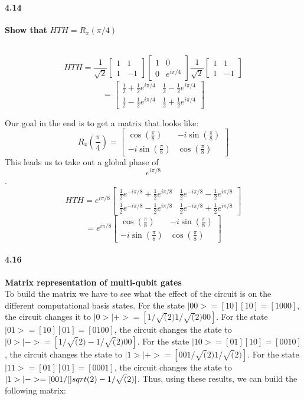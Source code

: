\paragraph{4.14} \textbf{Show that} $HTH = R_x(\pi/4)$

\\

$$HTH = \frac{1}{\sqrt{2}}\begin{bmatrix}1 & 1\\1 & -1\end{bmatrix}\begin{bmatrix}1 & 0\\0 & e^{i\pi /4}\end{bmatrix}\frac{1}{\sqrt{2}}\begin{bmatrix}1 & 1\\1 & -1\end{bmatrix}$$
$$= \begin{bmatrix}\frac{1}{2} + \frac{1}{2}e^{i \pi /4} & \frac{1}{2} - \frac{1}{2}e^{i \pi /4}\\\frac{1}{2} - \frac{1}{2}e^{i \pi /4} & \frac{1}{2} + \frac{1}{2}e^{i \pi /4}\end{bmatrix}$$


Our goal in the end is to get a matrix that looks like:
$$R_x(\frac{\pi}{4}) = \begin{bmatrix}\cos(\frac{\pi}{8}) & -i\sin(\frac{\pi}{8})\\-i\sin(\frac{\pi}{8}) & \cos(\frac{\pi}{8})\end{bmatrix}$$
This leads us to take out a global phase of $$e^{i\pi /8}$$.
$$HTH = e^{i\pi /8}\begin{bmatrix}\frac{1}{2}e^{-i\pi /8} + \frac{1}{2}e^{i\pi /8} & \frac{1}{2}e^{-i\pi /8} - \frac{1}{2}e^{i\pi /8}\\\frac{1}{2}e^{-i\pi /8} - \frac{1}{2}e^{i\pi /8} & \frac{1}{2}e^{-i\pi /8} + \frac{1}{2}e^{i\pi /8}\end{bmatrix}$$
$$= e^{i\pi /8} \begin{bmatrix}\cos(\frac{\pi}{8}) & -i\sin(\frac{\pi}{8})\\-i\sin(\frac{\pi}{8}) & \cos(\frac{\pi}{8})\end{bmatrix}$$


\paragraph{4.16} \textbf{Matrix representation of multi-qubit gates}
\\

To build the matrix we have to see what the effect of the circuit is on the different computational basis states. For the state $|00> = [1 0][1 0] = [1 0 0 0]$, the circuit changes it to $|0>|+> = [1/\sqrt(2) 1/\sqrt(2) 0 0]$. For the state $|01> = [1 0][0 1] = [0 1 0 0]$, the circuit changes the state to $|0>|-> = [1/\sqrt(2) -1/\sqrt(2) 0 0]$. For the state $|10> = [0 1][1 0] = [0 0 1 0]$, the circuit changes the state to $|1>|+> = [0 0 1/\sqrt(2) 1/\sqrt(2)]$. For the state $|11> = [0 1][0 1] = [0 0 0 1]$, the circuit changes the state to $|1>|-> = [0 0 1/\cite{}sqrt(2) -1/\sqrt(2)]$. 
        Thus, using these results, we can build the following matrix:
                
